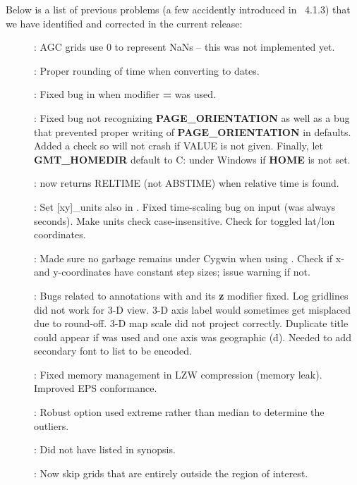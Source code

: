 Below is a list of previous problems (a few accidently introduced in \gmt\ 4.1.3)
that we have identified and corrected in the current release:

\begin{description}
\item []: AGC grids use 0 to represent NaNs -- this was not implemented yet.
\item []: Proper rounding of time when converting to dates.
\item []: Fixed bug in  when modifier {\bf =} was used.
\item []: Fixed bug not recognizing {\bf PAGE\_ORIENTATION} as well as a bug that
prevented proper writing of {\bf PAGE\_ORIENTATION} in defaults.  Added a check so 
will not crash if VALUE is not given.  Finally, let {\bf GMT\_HOMEDIR} default to C: under Windows
if {\bf HOME} is not set.
\item []:  now returns RELTIME (not ABSTIME) when relative time is found.
\item []: Set [xy]\_units also in .
Fixed time-scaling bug on input (was always seconds).  Make units check case-insensitive. Check for toggled lat/lon coordinates.
\item []: Made sure no garbage remains under Cygwin when using .
Check if x- and y-coordinates have constant step sizes; issue warning if not.
\item []: Bugs related to annotations with  and its {\bf z} modifier fixed.
Log gridlines did not work for 3-D view.  3-D axis label would sometimes get misplaced due to round-off.
3-D map scale did not project correctly.  Duplicate title could appear if  was used and one axis was geographic (d).
Needed to add secondary font to list to be encoded.
\item []: Fixed memory management in LZW compression (memory leak).  Improved EPS conformance.
\item []: Robust option used extreme rather than median to determine the outliers.
\item []: Did not have  listed in synopsis.
\item []: Now skip grids that are entirely outside the region of interest.

\end{description}
